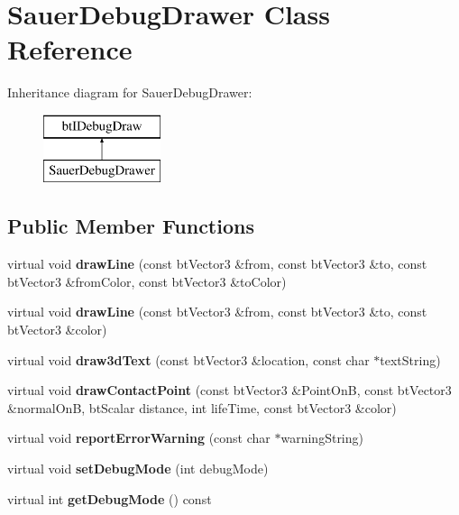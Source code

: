 \hypertarget{class_sauer_debug_drawer}{}\section{Sauer\+Debug\+Drawer Class Reference}
\label{class_sauer_debug_drawer}
Inheritance diagram for Sauer\+Debug\+Drawer\+:\begin{figure}[H]
\begin{center}
\leavevmode
\includegraphics[height=2.000000cm]{class_sauer_debug_drawer}
\end{center}
\end{figure}
\subsection*{Public Member Functions}
\begin{DoxyCompactItemize}
\item 
\mbox{\label{class_sauer_debug_drawer_adadc67f18bd13d2bfb5803bcb3132bb2}} 
virtual void {\bfseries draw\+Line} (const bt\+Vector3 \&from, const bt\+Vector3 \&to, const bt\+Vector3 \&from\+Color, const bt\+Vector3 \&to\+Color)
\item 
\mbox{\label{class_sauer_debug_drawer_adfd0dc842d13961b920b114539f0aa5b}} 
virtual void {\bfseries draw\+Line} (const bt\+Vector3 \&from, const bt\+Vector3 \&to, const bt\+Vector3 \&color)
\item 
\mbox{\label{class_sauer_debug_drawer_a0106781d0b63a872809fa405bd66d9d9}} 
virtual void {\bfseries draw3d\+Text} (const bt\+Vector3 \&location, const char $\ast$text\+String)
\item 
\mbox{\label{class_sauer_debug_drawer_a3563d66911ab119080496661b885cd85}} 
virtual void {\bfseries draw\+Contact\+Point} (const bt\+Vector3 \&Point\+OnB, const bt\+Vector3 \&normal\+OnB, bt\+Scalar distance, int life\+Time, const bt\+Vector3 \&color)
\item 
\mbox{\label{class_sauer_debug_drawer_acd2766828cbc3587aa290676f81a140e}} 
virtual void {\bfseries report\+Error\+Warning} (const char $\ast$warning\+String)
\item 
\mbox{\label{class_sauer_debug_drawer_aa21d0598245825b5d7c00ee0483cd783}} 
virtual void {\bfseries set\+Debug\+Mode} (int debug\+Mode)
\item 
\mbox{\label{class_sauer_debug_drawer_a0ed68758c18938ad805ae5748858fcd2}} 
virtual int {\bfseries get\+Debug\+Mode} () const
\end{DoxyCompactItemize}


